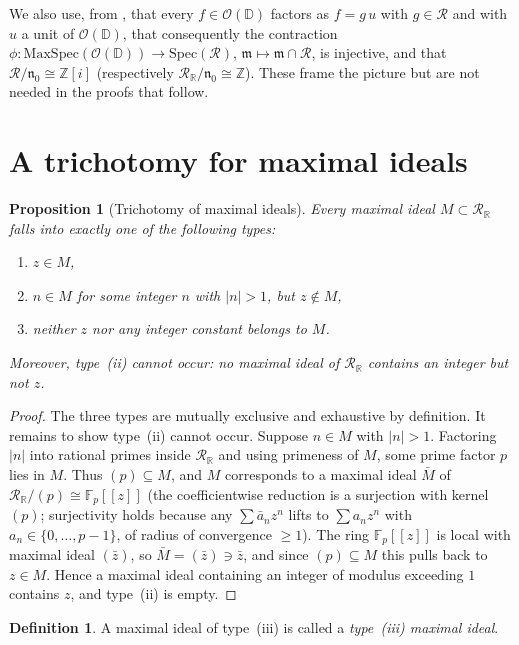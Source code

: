 \documentclass[12pt]{amsart}
\newtheorem{proposition}[theorem]{Proposition}
\theoremstyle{definition}
\newtheorem{definition}[theorem]{Definition}
\newcommand{\D}{\mathbb{D}}
\newcommand{\Z}{\mathbb{Z}}
\newcommand{\Zi}{\mathbb{Z}[i]}
\newcommand{\abs}[1]{\left|#1\right|}
\newcommand{\OD}{\mathcal{O}(\D)}
\newcommand{\mR}{\mathcal{R}}
\newcommand{\mRR}{\mathcal{R}_{\mathbb{R}}}
\begin{document}
We also use, from \cite{PaperI}, that every $f \in \OD$ factors as
$f = g\,u$ with $g \in \mR$ and with $u$ a unit of $\OD$, that
consequently the
contraction $\phi \colon \mathrm{MaxSpec}(\OD) \to \mathrm{Spec}(\mR)$,
$\mathfrak{m} \mapsto \mathfrak{m} \cap \mR$, is injective, and that
$\mR/\mathfrak{n}_0 \cong \Zi$ (respectively $\mRR/\mathfrak{n}_0 \cong
\Z$).  These frame the picture but are not needed in the proofs that
follow.

\section{A trichotomy for maximal ideals}
\label{sec:trichotomy}

\begin{proposition}[Trichotomy of maximal ideals]
\label{prop:trichotomy}
Every maximal ideal $M \subset \mRR$ falls into exactly one of the
following types:
\begin{enumerate}
\item[(i)] $z \in M$,
\item[(ii)] $n \in M$ for some integer $n$ with $\abs{n} > 1$, but
  $z \notin M$,
\item[(iii)] neither $z$ nor any integer constant belongs to $M$.
\end{enumerate}
Moreover, type~\emph{(ii)} cannot occur: no maximal ideal of $\mRR$
contains an integer but not $z$.
\end{proposition}

\begin{proof}
The three types are mutually exclusive and exhaustive by definition.
It remains to show type~(ii) cannot occur.  Suppose $n \in M$ with
$\abs{n} > 1$.  Factoring $\abs{n}$ into rational primes inside $\mRR$
and using primeness of $M$, some prime factor $p$ lies in $M$.  Thus
$(p) \subseteq M$, and $M$ corresponds to a maximal ideal $\bar M$ of
$\mRR/(p) \cong \mathbb{F}_p[[z]]$ (the coefficientwise reduction is a
surjection with kernel $(p)$; surjectivity holds because any $\sum \bar
a_n z^n$ lifts to $\sum a_n z^n$ with $a_n \in \{0,\ldots,p-1\}$, of
radius of convergence $\geq 1$).  The ring $\mathbb{F}_p[[z]]$ is local
with maximal ideal $(\bar z)$, so $\bar M = (\bar z) \ni \bar z$, and
since $(p) \subseteq M$ this pulls back to $z \in M$.  Hence a maximal
ideal containing an integer of modulus exceeding $1$ contains $z$, and
type~(ii) is empty.
\end{proof}

\begin{definition}
A maximal ideal of type~(iii) is called a \emph{type~(iii) maximal
ideal}.
\end{definition}
\end{document}
